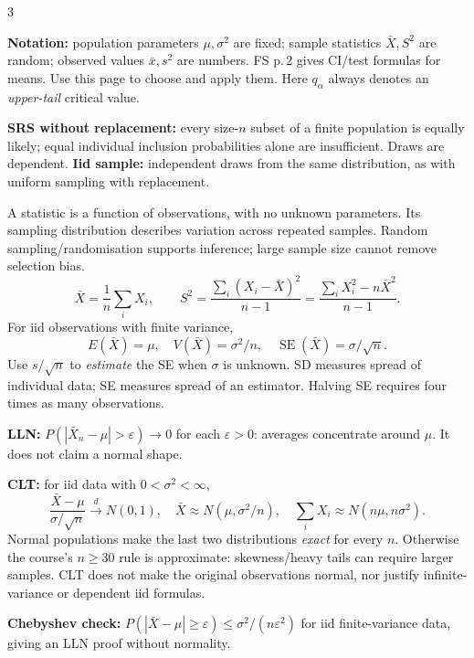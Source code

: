 \documentclass[10pt]{article}
\newcommand{\boxstart}[1]{\begin{tcolorbox}[title={#1},sharp corners]}
\newcommand{\boxend}{\end{tcolorbox}}
\begin{document}
\newpage
\begin{multicols*}{3}
\vspace*{-1em}
\boxstart{ST2334 Finals --- Ch. 5--7: Statistics}
\textbf{Notation:} population parameters $\mu,\sigma^2$ are fixed; sample statistics $\bar X,S^2$ are random; observed values $\bar x,s^2$ are numbers. FS p.\,2 gives CI/test formulas for means. Use this page to choose and apply them. Here $q_\alpha$ always denotes an \emph{upper-tail} critical value.
\boxend

\boxstart{Ch. 5 --- Sampling, statistics and standard error}
\textbf{SRS without replacement:} every size-$n$ subset of a finite population is equally likely; equal individual inclusion probabilities alone are insufficient. Draws are dependent. \textbf{Iid sample:} independent draws from the same distribution, as with uniform sampling with replacement.

A statistic is a function of observations, with no unknown parameters. Its sampling distribution describes variation across repeated samples. Random sampling/randomisation supports inference; large sample size cannot remove selection bias.
\[
\bar X=\frac1n\sum_iX_i,\qquad
S^2=\frac{\sum_i(X_i-\bar X)^2}{n-1}
=\frac{\sum_iX_i^2-n\bar X^2}{n-1}.
\]
For iid observations with finite variance,
\[
E(\bar X)=\mu,\quad V(\bar X)=\sigma^2/n,\quad
\operatorname{SE}(\bar X)=\sigma/\sqrt n.
\]
Use $s/\sqrt n$ to \emph{estimate} the SE when $\sigma$ is unknown. SD measures spread of individual data; SE measures spread of an estimator. Halving SE requires four times as many observations.
\boxend

\boxstart{Ch. 5 --- LLN versus CLT; exact versus approximate}
\textbf{LLN:} $P(|\bar X_n-\mu|>\varepsilon)\to0$ for each $\varepsilon>0$: averages concentrate around $\mu$. It does not claim a normal shape.

\textbf{CLT:} for iid data with $0<\sigma^2<\infty$,
\[
\frac{\bar X-\mu}{\sigma/\sqrt n}\xrightarrow{d}N(0,1),\quad
\bar X\approx N(\mu,\sigma^2/n),\quad
\sum_iX_i\approx N(n\mu,n\sigma^2).
\]
Normal populations make the last two distributions \emph{exact} for every $n$. Otherwise the course's $n\ge30$ rule is approximate: skewness/heavy tails can require larger samples. CLT does not make the original observations normal, nor justify infinite-variance or dependent iid formulas.

\textbf{Chebyshev check:} $P(|\bar X-\mu|\ge\varepsilon)\le\sigma^2/(n\varepsilon^2)$ for iid finite-variance data, giving an LLN proof without normality.
\boxend


\end{multicols*}
\end{document}

